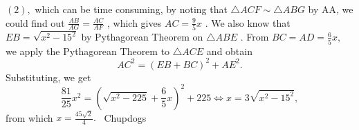 \documentclass[12pt]{article}
\begin{document}
$(2),$ which can be time consuming, by noting that $\triangle ACF \sim \triangle ABG$ by AA, we could find out $\frac{AB}{AG} = \frac{AC}{AF}$ , which gives $AC = \frac{9}{5}x$ . We also know that $EB = \sqrt{x^2 - 15^2}$ by Pythagorean Theorem on $\triangle ABE$ . From $BC = AD = \frac{6}{5}x,$ we apply the Pythagorean Theorem to $\triangle ACE$ and obtain \[AC^2 = (EB+BC)^2 + AE^2.\] Substituting, we get \[\frac{81}{25}x^2 = \left(\sqrt{x^2 -225}+\frac{6}{5}x\right)^2+225 \iff x = 3\sqrt{x^2 - 15^2},\] from which $x = \frac{45\sqrt{2}}{4}.$ ~Chupdogs
\end{document}
